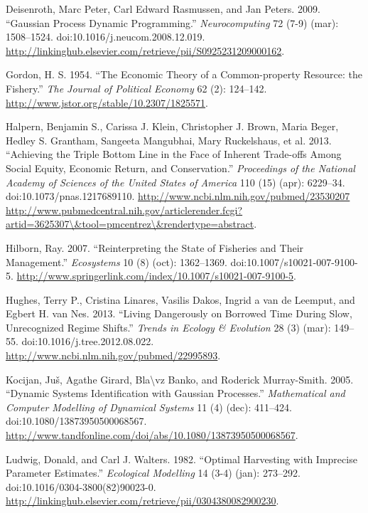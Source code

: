 \documentclass[author-year, review]{elsarticle} %
\begin{document}
Deisenroth, Marc Peter, Carl Edward Rasmussen, and Jan Peters. 2009.
``Gaussian Process Dynamic Programming.'' \emph{Neurocomputing} 72 (7-9)
(mar): 1508--1524. doi:10.1016/j.neucom.2008.12.019.
\url{http://linkinghub.elsevier.com/retrieve/pii/S0925231209000162}.

Gordon, H. S. 1954. ``The Economic Theory of a Common-property Resource:
the Fishery.'' \emph{The Journal of Political Economy} 62 (2): 124--142.
\url{http://www.jstor.org/stable/10.2307/1825571}.

Halpern, Benjamin S., Carissa J. Klein, Christopher J. Brown, Maria
Beger, Hedley S. Grantham, Sangeeta Mangubhai, Mary Ruckelshaus, et al.
2013. ``Achieving the Triple Bottom Line in the Face of Inherent
Trade-offs Among Social Equity, Economic Return, and Conservation.''
\emph{Proceedings of the National Academy of Sciences of the United
States of America} 110 (15) (apr): 6229--34.
doi:10.1073/pnas.1217689110.
\href{http://www.ncbi.nlm.nih.gov/pubmed/23530207 http://www.pubmedcentral.nih.gov/articlerender.fcgi?artid=3625307/\&tool=pmcentrez/\&rendertype=abstract}{http://www.ncbi.nlm.nih.gov/pubmed/23530207
http://www.pubmedcentral.nih.gov/articlerender.fcgi?artid=3625307\textbackslash{}\&tool=pmcentrez\textbackslash{}\&rendertype=abstract}.

Hilborn, Ray. 2007. ``Reinterpreting the State of Fisheries and Their
Management.'' \emph{Ecosystems} 10 (8) (oct): 1362--1369.
doi:10.1007/s10021-007-9100-5.
\url{http://www.springerlink.com/index/10.1007/s10021-007-9100-5}.

Hughes, Terry P., Cristina Linares, Vasilis Dakos, Ingrid a van de
Leemput, and Egbert H. van Nes. 2013. ``Living Dangerously on Borrowed
Time During Slow, Unrecognized Regime Shifts.'' \emph{Trends in Ecology
\& Evolution} 28 (3) (mar): 149--55. doi:10.1016/j.tree.2012.08.022.
\url{http://www.ncbi.nlm.nih.gov/pubmed/22995893}.

Kocijan, Juš, Agathe Girard, Bla\textbackslash{}vz Banko, and Roderick
Murray-Smith. 2005. ``Dynamic Systems Identification with Gaussian
Processes.'' \emph{Mathematical and Computer Modelling of Dynamical
Systems} 11 (4) (dec): 411--424. doi:10.1080/13873950500068567.
\url{http://www.tandfonline.com/doi/abs/10.1080/13873950500068567}.

Ludwig, Donald, and Carl J. Walters. 1982. ``Optimal Harvesting with
Imprecise Parameter Estimates.'' \emph{Ecological Modelling} 14 (3-4)
(jan): 273--292. doi:10.1016/0304-3800(82)90023-0.
\url{http://linkinghub.elsevier.com/retrieve/pii/0304380082900230}.
\end{document}
